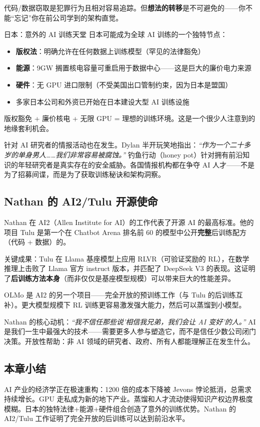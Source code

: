代码/数据窃取是犯罪行为且相对容易追踪。但\textbf{想法的转移}是不可避免的——你不能``忘记''你在前公司学到的架构直觉。

\begin{knowledgebox}{日本：意外的 AI 训练天堂}
日本可能成为全球 AI 训练的一个独特节点：
\begin{itemize}
    \item \textbf{版权法}：明确允许在任何数据上训练模型（罕见的法律豁免）
    \item \textbf{能源}：9GW 搁置核电容量可重启用于数据中心——这是巨大的廉价电力来源
    \item \textbf{硬件}：无 GPU 进口限制（不受美国出口管制约束，因为日本是盟国）
    \item 多家日本公司和外资已开始在日本建设大型 AI 训练设施
\end{itemize}

版权豁免 + 廉价核电 + 无限 GPU = 理想的训练环境。这是一个很少人注意到的地缘套利机会。
\end{knowledgebox}

针对 AI 研究者的情报活动也在发生。Dylan 半开玩笑地指出：\textit{``作为一个二十多岁的单身男人……我们非常容易被腐蚀。''} 钓鱼行动（honey pot）针对拥有前沿知识的年轻研究者是真实存在的安全威胁。各国情报机构都在争夺 AI 人才——不是为了招募间谍，而是为了获取训练秘诀和架构洞察。

\subsection{Nathan 的 AI2/Tulu 开源使命}

Nathan 在 AI2（Allen Institute for AI）的工作代表了开源 AI 的最高标准。他的项目 Tulu 是第一个在 Chatbot Arena 排名前 60 的模型中公开\textbf{完整}后训练配方（代码 + 数据）的。

关键成果：Tulu 在 Llama 基座模型上应用 RLVR（可验证奖励的 RL），在数学推理上击败了 Llama 官方 instruct 版本，并匹配了 DeepSeek V3 的表现。这证明了\textbf{后训练方法本身}（而非仅仅是基座模型规模）可以带来巨大的性能差异。

OLMo 是 AI2 的另一个项目——完全开放的预训练工作（与 Tulu 的后训练互补）。更大模型规模下 RL 训练更容易激发强大能力，然后可以蒸馏到小模型。

Nathan 的核心动机：\textit{``我不信任那些说'相信我兄弟，我们会让 AI 变好'的人。''} AI 是我们一生中最强大的技术——需要更多人参与塑造它，而不是信任少数公司闭门决策。开放性帮助：非 AI 领域的研究者、政府、所有人都能理解正在发生什么。

\subsection{本章小结}

AI 产业的经济学正在极速重构：1200 倍的成本下降被 Jevons 悖论抵消，总需求持续增长。GPU 走私成为新的地下产业。蒸馏和人才流动使得知识产权边界极度模糊。日本的独特法律+能源+硬件组合创造了意外的训练优势。Nathan 的 AI2/Tulu 工作证明了完全开放的后训练可以达到前沿水平。

